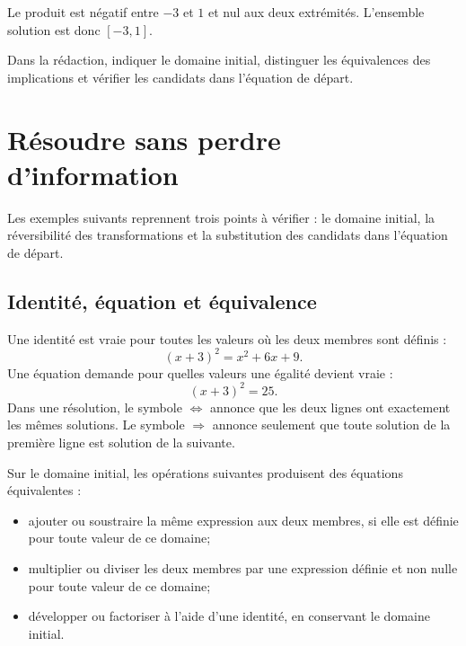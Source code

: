 \begin{center}
\end{center}

Le produit est négatif entre $-3$ et $1$ et nul aux deux extrémités. L'ensemble solution est donc $[-3,1]$.

\begin{connectionbox}
Dans la rédaction, indiquer le domaine initial, distinguer les équivalences des implications et vérifier les candidats dans l'équation de départ.
\end{connectionbox}


\section{Résoudre sans perdre d'information}
\label{manual:section:02.08}

Les exemples suivants reprennent trois points à vérifier : le domaine initial, la réversibilité des transformations et la substitution des candidats dans l'équation de départ.

\subsection{Identité, équation et équivalence}

Une identité est vraie pour toutes les valeurs où les deux membres sont définis :
\[
(x+3)^2=x^2+6x+9.
\]
Une équation demande pour quelles valeurs une égalité devient vraie :
\[
(x+3)^2=25.
\]
Dans une résolution, le symbole $\Longleftrightarrow$ annonce que les deux lignes ont exactement les mêmes solutions. Le symbole $\Longrightarrow$ annonce seulement que toute solution de la première ligne est solution de la suivante.

Sur le domaine initial, les opérations suivantes produisent des équations équivalentes :
\begin{itemize}
\item ajouter ou soustraire la même expression aux deux membres, si elle est définie pour toute valeur de ce domaine;
\item multiplier ou diviser les deux membres par une expression définie et non nulle pour toute valeur de ce domaine;
\item développer ou factoriser à l'aide d'une identité, en conservant le domaine initial.
\end{itemize}


